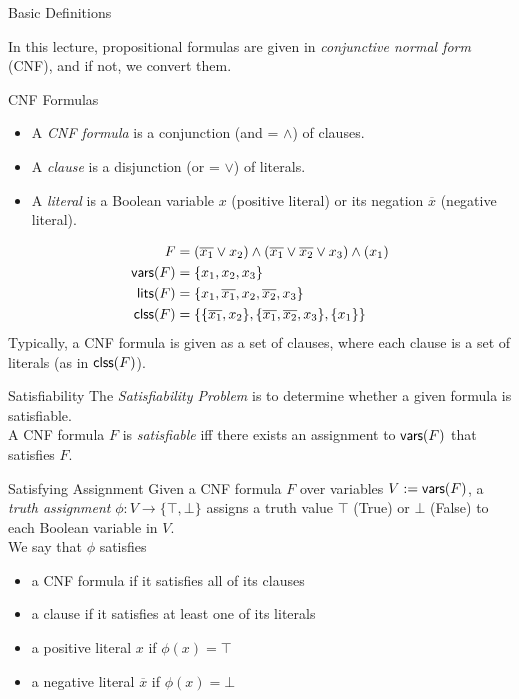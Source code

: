 \documentclass[t]{sdqbeamer}
\begin{document}
\begin{frame}{Basic Definitions}

In this lecture, propositional formulas are given in \emph{conjunctive normal form} (CNF), and if not, we convert them.

\begin{block}{CNF Formulas}
	\begin{itemize}
		\item A \emph{CNF formula} is a conjunction (and = $\wedge$) of clauses.
		\item A \emph{clause} is a disjunction (or = $\vee$) of literals.
		\item A \emph{literal} is a Boolean variable $x$ (positive literal) or its negation $\overline{x}$ (negative literal).
	\end{itemize}	
\end{block}

\begin{example}
	\vspace{-3ex}
	\begin{align*}
		F &= (\overline{x_1} \vee x_2) \wedge (\overline{x_1} \vee \overline {x_2} \vee x_3) \wedge (x_1)\\
		\textsf{vars} (F) &= \{x_1, x_2, x_3\}\\
		\textsf{lits} (F) &= \{x_1, \overline{x_1}, x_2, \overline{x_2}, x_3\}\\
		\textsf{clss} (F) &= \{ \{ \overline{x_1}, x_2 \}, \{ \overline{x_1}, \overline {x_2}, x_3 \}, \{ x_1 \} \}
	\end{align*}
	Typically, a CNF formula is given as a set of clauses, where each clause is a set of literals (as in $\textsf{clss} (F)$).
\end{example}
\end{frame}

\begin{frame}{Satisfiability}
	The \emph{Satisfiability Problem} is to determine whether a given formula is satisfiable.\\
	A CNF formula $F$ is \emph{satisfiable} iff there exists an assignment to $\textsf{vars} (F)$ that satisfies $F$.
	\begin{block}{Satisfying Assignment}
		Given a CNF formula $F$ over variables $V := \textsf{vars} (F)$, a \emph{truth assignment} $\phi : V \rightarrow \{ \top, \bot \}$ assigns a truth value $\top$ (True) or $\bot$ (False) to each Boolean variable in $V$.\\[1em]
		We say that $\phi$ satisfies
			\begin{itemize}
				\item a CNF formula if it satisfies all of its clauses
				\item a clause if it satisfies at least one of its literals
				\item a positive literal $x$ if $\phi(x)=\top$
				\item a negative literal $\overline{x}$ if $\phi(x)=\bot$
			\end{itemize}
	\end{block}
\end{frame}
\end{document}
